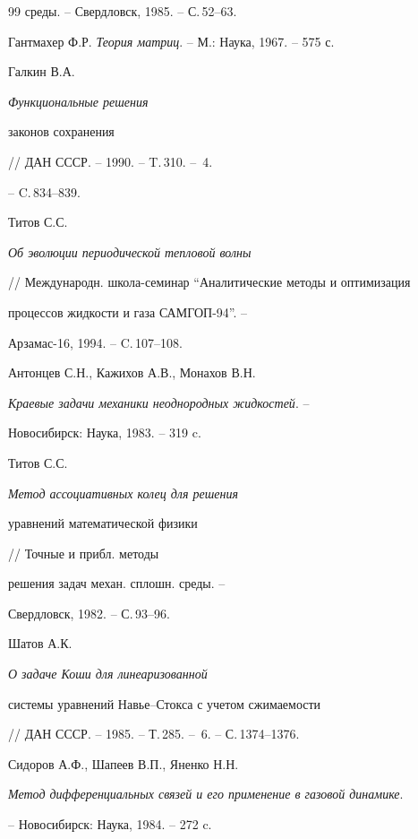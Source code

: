 \begin{thebibliography}{99}
среды. -- Свердловск, 1985. -- С.\,52--63.




Гантмахер Ф.Р. {\em Теория матриц}. -- М.: Наука, 1967. -- 575 с.


 Галкин В.А. {\em Функциональные решения


законов сохранения} // ДАН СССР. -- 1990. -- T.\,310. -- \No\,4.


-- C.\,834--839.


 Титов С.С.


{\em Об эволюции периодической тепловой волны}


// Международн. школа-семинар ``Аналитические методы и оптимизация


процессов жидкости и газа САМГОП-94''. --


Арзамас-16, 1994. -- C.\,107--108.




Антонцев С.Н., Кажихов А.В., Монахов В.Н.


{\em Краевые задачи механики неоднородных жидкостей}. --


Новосибирск: Наука, 1983. -- 319 c.


%




Титов С.С. {\em Метод ассоциативных колец для решения


уравнений математической физики} // Точные и прибл. методы


решения задач механ. сплошн. среды. --


Свердловск, 1982. -- С.\,93--96.




Шатов А.К.


{\em О задаче Коши для линеаризованной


системы уравнений Навье--Стокса с учетом сжимаемости}


// ДАН СССР. -- 1985. -- Т.\,285. -- \No\,6. -- С.\,1374--1376.




Сидоров А.Ф., Шапеев В.П., Яненко Н.Н.


{\em Метод дифференциальных связей и его применение в газовой динамике}.


-- Новосибирск: Наука, 1984. -- 272 c.





\end{thebibliography}





\vskip 2cm












\label{end}





